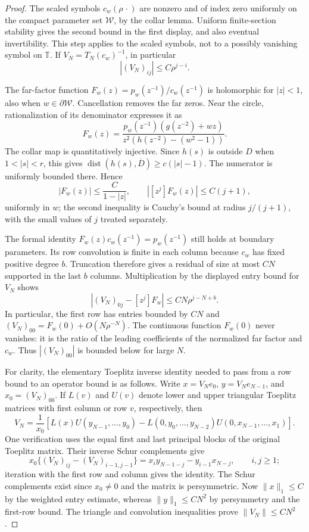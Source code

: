 \documentclass[11pt]{article}
\newcommand{\T}{\mathbb T}
\begin{document}
\begin{proof}
The scaled symbols $c_w(\rho\,\cdot)$ are nonzero and of index zero
uniformly on the compact parameter set $\mathcal W$, by the collar
lemma. Uniform finite-section stability gives the second bound in
the first display, and also eventual invertibility. This step applies
to the scaled symbols, not to a possibly vanishing symbol on $\T$.
If $V_N=T_N(c_w)^{-1}$, in particular
\[
 |(V_N)_{ij}|\le C\rho^{j-i}.
\]

The far-factor function $F_w(z)=p_w(z^{-1})/c_w(z^{-1})$ is
holomorphic for $|z|<1$, also when $w\in\partial\mathcal W$.
Cancellation removes the far zeros. Near the circle, rationalization
of its denominator expresses it as
\[
 F_w(z)=\frac{p_w(z^{-1})(g(z^{-2})+wz)}
                {z^2(h(z^{-2})-(w^2-1))}.
\]
The collar map is quantitatively injective. Since $h(s)$ is outside
$D$ when $1<|s|<r$, this gives
$\operatorname{dist}(h(s),\overline D)\ge c(|s|-1)$.
The numerator is uniformly bounded there. Hence
\[
 |F_w(z)|\le\frac C{1-|z|},\qquad
 |[z^j]F_w(z)|\le C(j+1),
\]
uniformly in $w$; the second inequality is Cauchy's bound at
radius $j/(j+1)$, with the small values of $j$ treated separately.

The formal identity $F_w(z)c_w(z^{-1})=p_w(z^{-1})$ still holds at
boundary parameters. Its row convolution is finite in each column
because $c_w$ has fixed positive degree $b$. Truncation therefore
gives a residual of size at most $CN$ supported in the last $b$
columns. Multiplication by the displayed entry bound for $V_N$ shows
\[
 |(V_N)_{0j}-[z^j]F_w|\le CN\rho^{j-N+b}.
\]
In particular, the first row has entries bounded by $CN$ and
$(V_N)_{00}=F_w(0)+O(N\rho^{-N})$. The continuous function $F_w(0)$
never vanishes: it is the ratio of the leading coefficients of the
normalized far factor and $c_w$. Thus $|(V_N)_{00}|$ is bounded
below for large $N$.

For clarity, the elementary Toeplitz inverse identity needed to pass
from a row bound to an operator bound is as follows. Write
$x=V_Ne_0$, $y=V_Ne_{N-1}$, and $x_0=(V_N)_{00}$.
If $L(v)$ and $U(v)$ denote lower and upper triangular Toeplitz
matrices with first column or row $v$, respectively, then
\[
 V_N=\frac1{x_0}\left[
 L(x)U(y_{N-1},\ldots,y_0)
 -L(0,y_0,\ldots,y_{N-2})U(0,x_{N-1},\ldots,x_1)\right].
\]
One verification uses the equal first and last principal blocks of
the original Toeplitz matrix. Their inverse Schur complements give
\[
 x_0\{(V_N)_{ij}-(V_N)_{i-1,j-1}\}
 =x_i y_{N-1-j}-y_{i-1}x_{N-j},\qquad i,j\ge1;
\]
iteration with the first row and column gives the identity. The
Schur complements exist since $x_0\ne0$ and the matrix is
persymmetric. Now $\|x\|_1\le C$ by the weighted entry estimate,
whereas $\|y\|_1\le CN^2$ by persymmetry and the first-row bound.
The triangle and convolution inequalities prove $\|V_N\|\le CN^2$.


\end{proof}
\end{document}
